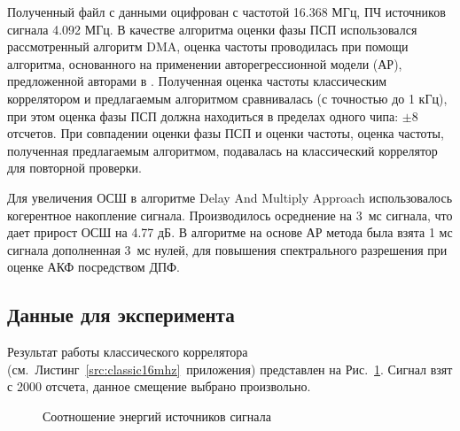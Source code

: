 Полученный файл с данными оцифрован с частотой 16.368 МГц, ПЧ источников сигнала 4.092 МГц. В качестве алгоритма оценки фазы ПСП использовался рассмотренный алгоритм DMA,
оценка частоты проводилась при помощи алгоритма, основанного на применении авторегрессионной модели (АР), предложенной авторами в \cite{my_otchet}. Полученная оценка
частоты классическим коррелятором и предлагаемым алгоритмом сравнивалась (с точностью до 1 кГц), при этом оценка фазы ПСП должна находиться в пределах одного чипа: ${\pm 8}$
отсчетов. При совпадении оценки фазы ПСП и оценки частоты, оценка частоты, полученная предлагаемым алгоритмом, подавалась на классический коррелятор для повторной проверки.

Для увеличения ОСШ в алгоритме Delay And Multiply Approach использовалось когерентное накопление сигнала. Производилось осреднение на \mbox{3 мс} сигнала, что дает прирост ОСШ на 4.77 дБ.
В алгоритме на основе АР метода была взята 1 мс сигнала дополненная \mbox{3 мс} нулей, для повышения спектрального разрешения при оценке АКФ посредством ДПФ.

\subsection{Данные для эксперимента}

Результат работы классического коррелятора \mbox{(см. Листинг \ref{src:classic16mhz} приложения)} представлен на \mbox{Рис. \ref{pic:16mhz_sats_all}.}
Сигнал взят с 2000 отсчета, данное смещение выбрано произвольно.
\begin{figure}[h]
\center{}
	\caption{Соотношение энергий источников сигнала}
	\label{pic:16mhz_sats_all}
\end{figure}

